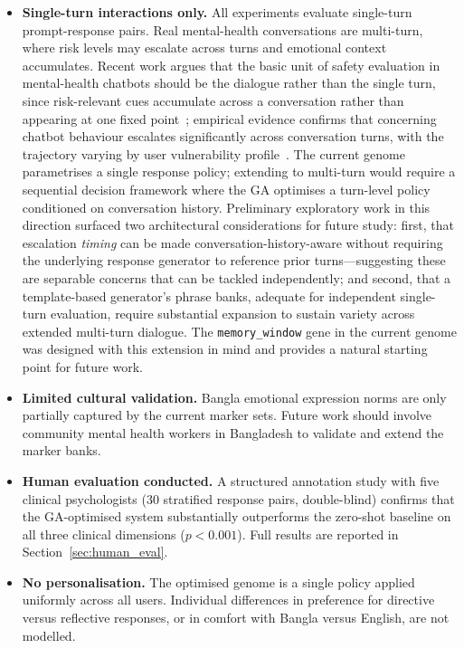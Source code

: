 \documentclass[mathematics,article,xetex,moreauthors]{Definitions/mdpi}
\begin{document}
\begin{itemize}
  \item \textbf{Single-turn interactions only.} All experiments evaluate
  single-turn prompt-response pairs. Real mental-health conversations
  are multi-turn, where risk levels may escalate across turns and
  emotional context accumulates. Recent work argues that the basic
  unit of safety evaluation in mental-health chatbots should be the
  dialogue rather than the single turn, since risk-relevant cues
  accumulate across a conversation rather than appearing at one fixed
  point~\cite{journey2026}; empirical evidence confirms that
  concerning chatbot behaviour escalates significantly across
  conversation turns, with the trajectory varying by user
  vulnerability profile~\cite{vail2026}. The current genome
  parametrises a single response policy; extending to multi-turn
  would require a sequential decision framework where the GA
  optimises a turn-level policy conditioned on conversation history.
  Preliminary exploratory work in this direction surfaced two
  architectural considerations for future study: first, that
  escalation \emph{timing} can be made conversation-history-aware
  without requiring the underlying response generator to reference
  prior turns---suggesting these are separable concerns that can be
  tackled independently; and second, that a template-based
  generator's phrase banks, adequate for independent single-turn
  evaluation, require substantial expansion to sustain variety across
  extended multi-turn dialogue. The \texttt{memory\_window} gene in
  the current genome was designed with this extension in mind and
  provides a natural starting point for future work.

  \item \textbf{Limited cultural validation.} Bangla emotional expression
        norms are only partially captured by the current marker sets. Future
        work should involve community mental health workers in Bangladesh to
        validate and extend the marker banks.

  \item \textbf{Human evaluation conducted.} A structured annotation
    study with five clinical psychologists (30 stratified response pairs,
    double-blind) confirms that the GA-optimised system substantially
    outperforms the zero-shot baseline on all three clinical dimensions
    ($p < 0.001$). Full results are reported in Section~\ref{sec:human_eval}.

  \item \textbf{No personalisation.} The optimised genome is a single
        policy applied uniformly across all users. Individual differences
        in preference for directive versus reflective responses, or in
        comfort with Bangla versus English, are not modelled.
\end{itemize}
\end{document}
